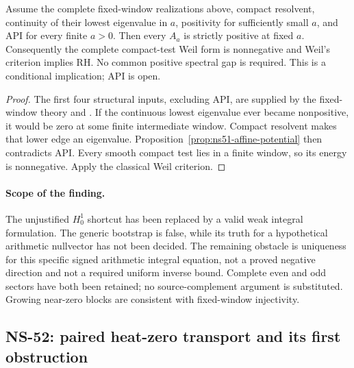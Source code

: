 \begin{proposition}
\label{prop:ns51-sign-continuation}
Assume the complete fixed-window realizations above, compact resolvent,
continuity of their lowest eigenvalue in $a$, positivity for sufficiently
small $a$, and API for every finite $a>0$. Then every $A_a$ is strictly
positive at fixed $a$. Consequently the complete compact-test Weil
form is nonnegative and Weil's criterion implies RH. No common positive
spectral gap is required. This is a conditional implication; API is open.
\end{proposition}
\begin{proof}
The first four structural inputs, excluding API, are supplied by the
fixed-window theory and \cite[Theorems 1.3--1.4]{Suzuki2026}.
If the continuous lowest eigenvalue ever became nonpositive, it would
be zero at some finite intermediate window. Compact resolvent makes
that lower edge an eigenvalue. Proposition~\ref{prop:ns51-affine-potential}
then contradicts API. Every smooth compact test lies in a finite window,
so its energy is nonnegative. Apply the classical Weil criterion.
\end{proof}

\paragraph{Scope of the finding.}
The unjustified $H_0^1$ shortcut has been replaced by a valid weak
integral formulation. The generic bootstrap is false, while its truth
for a hypothetical arithmetic nullvector has not been decided. The
remaining obstacle is uniqueness for this specific signed arithmetic
integral equation, not a proved negative direction and not a required
uniform inverse bound. Complete even and odd sectors have both been
retained; no source-complement argument is substituted. Growing
near-zero blocks are consistent with fixed-window injectivity.


\subsection*{NS-52: paired heat-zero transport and its first obstruction}

